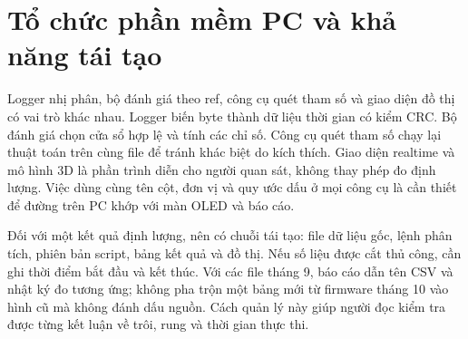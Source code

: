 \section{Tổ chức phần mềm PC và khả năng tái tạo}
Logger nhị phân, bộ đánh giá theo ref, công cụ quét tham số và giao diện đồ thị có vai trò khác nhau. Logger biến byte thành dữ liệu thời gian có kiểm CRC. Bộ đánh giá chọn cửa sổ hợp lệ và tính các chỉ số. Công cụ quét tham số chạy lại thuật toán trên cùng file để tránh khác biệt do kích thích. Giao diện realtime và mô hình 3D là phần trình diễn cho người quan sát, không thay phép đo định lượng. Việc dùng cùng tên cột, đơn vị và quy ước dấu ở mọi công cụ là cần thiết để đường trên PC khớp với màn OLED và báo cáo.

Đối với một kết quả định lượng, nên có chuỗi tái tạo: file dữ liệu gốc, lệnh phân tích, phiên bản script, bảng kết quả và đồ thị. Nếu số liệu được cắt thủ công, cần ghi thời điểm bắt đầu và kết thúc. Với các file tháng 9, báo cáo dẫn tên CSV và nhật ký đo tương ứng; không pha trộn một bảng mới từ firmware tháng 10 vào hình cũ mà không đánh dấu nguồn. Cách quản lý này giúp người đọc kiểm tra được từng kết luận về trôi, rung và thời gian thực thi.

